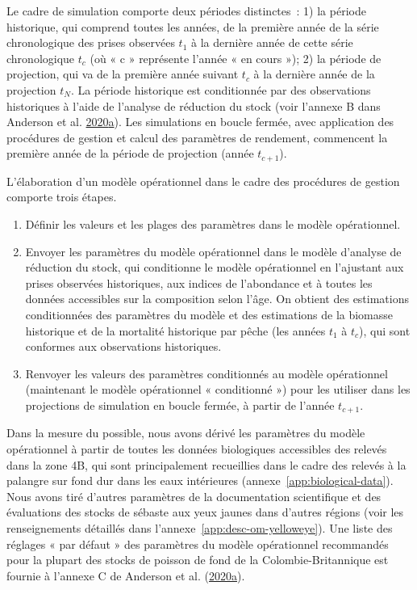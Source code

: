 \documentclass[11pt]{book}
\begin{document}
Le cadre de simulation comporte deux périodes distinctes~: 1) la période historique, qui comprend toutes les années, de la première année de la série chronologique des prises observées \(t_1\) à la dernière année de cette série chronologique \(t_c\) (où « c » représente l'année « en cours »); 2) la période de projection, qui va de la première année suivant \(t_c\) à la dernière année de la projection \(t_N\). La période historique est conditionnée par des observations historiques à l'aide de l'analyse de réduction du stock (voir l'annexe B dans Anderson et al. \protect\hyperlink{ref-anderson2020gfmp}{2020}\protect\hyperlink{ref-anderson2020gfmp}{a}). Les simulations en boucle fermée, avec application des procédures de gestion et calcul des paramètres de rendement, commencent la première année de la période de projection (année \(t_{c+1}\)).

L'élaboration d'un modèle opérationnel dans le cadre des procédures de gestion comporte trois étapes.
\begin{enumerate}
\def\labelenumi{\arabic{enumi}.}
\item
  Définir les valeurs et les plages des paramètres dans le modèle opérationnel.
\item
  Envoyer les paramètres du modèle opérationnel dans le modèle d'analyse de réduction du stock, qui conditionne le modèle opérationnel en l'ajustant aux prises observées historiques, aux indices de l'abondance et à toutes les données accessibles sur la composition selon l'âge. On obtient des estimations conditionnées des paramètres du modèle et des estimations de la biomasse historique et de la mortalité historique par pêche (les années \(t_1\) à \(t_c\)), qui sont conformes aux observations historiques.
\item
  Renvoyer les valeurs des paramètres conditionnés au modèle opérationnel (maintenant le modèle opérationnel « conditionné ») pour les utiliser dans les projections de simulation en boucle fermée, à partir de l'année \(t_{c+1}\).
\end{enumerate}
Dans la mesure du possible, nous avons dérivé les paramètres du modèle opérationnel à partir de toutes les données biologiques accessibles des relevés dans la zone 4B, qui sont principalement recueillies dans le cadre des relevés à la palangre sur fond dur dans les eaux intérieures (annexe~\ref{app:biological-data}). Nous avons tiré d'autres paramètres de la documentation scientifique et des évaluations des stocks de sébaste aux yeux jaunes dans d'autres régions (voir les renseignements détaillés dans l'annexe~\ref{app:desc-om-yelloweye}). Une liste des réglages « par défaut » des paramètres du modèle opérationnel recommandés pour la plupart des stocks de poisson de fond de la Colombie-Britannique est fournie à l'annexe C de Anderson et al. (\protect\hyperlink{ref-anderson2020gfmp}{2020}\protect\hyperlink{ref-anderson2020gfmp}{a}).
\end{document}
